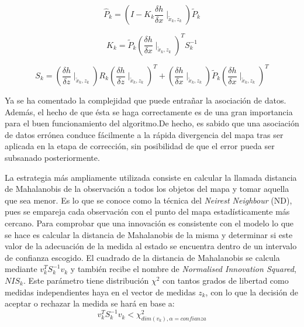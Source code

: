  \begin{equation}\label{eq:P_estimationEKF_im}
    \hat{P}_{k} = (I-K_{k}\frac{\delta h}{\delta x}\mid_{\tilde{x}_{k},z_{k}})\tilde{P}_{k}
\end{equation}

\begin{equation}\label{eq:KEKF_im}
    K_{k} = \tilde{P}_{k}(\frac{\delta h}{\delta x}\mid_{\tilde{x}_{k},z_{k}})^{T}S_{k}^{-1}
\end{equation}

\begin{equation}\label{eq:SEKF_im}
    S_{k} = (\frac{\delta h}{\delta z} \mid _{\tilde{x}_{k},z_{k}}) R_{k} (\frac{\delta h}{\delta z} \mid _{\tilde{x}_{k},z_{k}})^{T}+(\frac{\delta h}{\delta x}\mid_{\tilde{x}_{k},z_{k}})\tilde{P}_{k} (\frac{\delta h}{\delta x}\mid_{\tilde{x}_{k},z_{k}})^{T}
\end{equation}

Ya se ha comentado la complejidad que puede entrañar la asociación de datos. Además, el hecho de que ésta se haga correctamente es de una gran importancia para el buen funcionamiento del algoritmo.De hecho, es sabido que una asociación de datos errónea conduce fácilmente a la rápida divergencia del mapa tras ser aplicada en la etapa de corrección, sin posibilidad de que el error pueda ser subsanado posteriormente.

La estrategia más ampliamente utilizada consiste en calcular la llamada distancia de Mahalanobis de la observación a todos los objetos del mapa y tomar aquella que sea menor. Es lo que se conoce como la técnica del \emph{Neirest Neighbour }(ND), pues se empareja cada observación con el punto del mapa estadísticamente más cercano. Para comprobar que una innovación es consistente con el modelo lo que se hace es calcular la distancia de Mahalanobis de la misma y determinar si este valor de la adecuación de la medida al estado se encuentra dentro de un intervalo de confianza escogido. El cuadrado de la distancia de Mahalanobis se calcula mediante $v_{k}^{T}S_{k}^{-1}v_{k}$ y también recibe el nombre de \emph{Normalised Innovation Squared}, $NIS_{k}$. Este parámetro tiene distribución $\chi^{2}$ con tantos grados de libertad como medidas independientes haya en el vector de medidas $z_{k}$, con lo que la decisión de aceptar o rechazar la medida se hará en base a:
\begin{equation}\label{eq:mahalanobis}
    v_{k}^{T}S_{k}^{-1}v_{k}<\chi^{2}_{dim(v_{k}),\alpha = confianza}
\end{equation}

